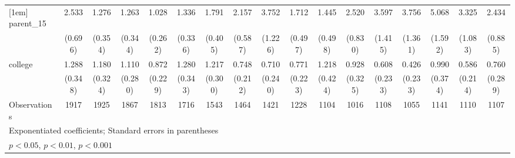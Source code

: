 {\begin{tabular}{l*{16}{c}}
[1em]
parent\_15           &       2.533\sym{***}&       1.276         &       1.263         &       1.028         &       1.336         &       1.791\sym{**} &       2.157\sym{**} &       3.752\sym{***}&       1.712         &       1.445         &       2.520\sym{**} &       3.597\sym{**} &       3.756\sym{***}&       5.068\sym{***}&       3.325\sym{***}&       2.434\sym{*}  \\
                    &     (0.696)         &     (0.354)         &     (0.344)         &     (0.262)         &     (0.336)         &     (0.405)         &     (0.587)         &     (1.226)         &     (0.497)         &     (0.498)         &     (0.830)         &     (1.415)         &     (1.361)         &     (1.592)         &     (1.083)         &     (0.885)         \\
[1em]
college             &       1.288         &       1.180         &       1.110         &       0.872         &       1.280         &       1.217         &       0.748         &       0.710         &       0.771         &       1.218         &       0.928         &       0.608         &       0.426         &       0.990         &       0.586         &       0.760         \\
                    &     (0.348)         &     (0.324)         &     (0.280)         &     (0.229)         &     (0.343)         &     (0.300)         &     (0.212)         &     (0.240)         &     (0.223)         &     (0.424)         &     (0.325)         &     (0.233)         &     (0.233)         &     (0.374)         &     (0.214)         &     (0.289)         \\
\hline
Observations        &        1917         &        1925         &        1867         &        1813         &        1716         &        1543         &        1464         &        1421         &        1228         &        1104         &        1016         &        1108         &        1055         &        1141         &        1110         &        1107         \\
\hline\hline
\multicolumn{17}{l}{\footnotesize Exponentiated coefficients; Standard errors in parentheses}\\
\multicolumn{17}{l}{\footnotesize \sym{*} \(p<0.05\), \sym{**} \(p<0.01\), \sym{***} \(p<0.001\)}\\
\end{tabular}
}
